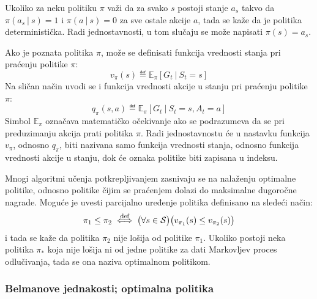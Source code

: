 Ukoliko za neku politiku $\pi$ važi da za svako $s$ postoji stanje $a_s$ takvo da $\pi(a_s~|~s)=1$ i $\pi(a~|~s)=0$ za sve ostale akcije $a$, tada se kaže da je politika deterministička. Radi jednostavnosti, u tom slučaju se može napisati $\pi(s)=a_s$.
\par 
Ako je poznata politika $\pi$, može se definisati funkcija vrednosti stanja pri praćenju politike $\pi$:
\begin{equation}
	v_{\pi}(s) \eqdef \mathbb{E}_{\pi}[G_t~|~S_t=s]
\end{equation}
Na sličan način uvodi se i funkcija vrednosti akcije u stanju pri praćenju politike $\pi$:
\begin{equation}
	q_{\pi}(s, a) \eqdef \mathbb{E}_{\pi}[G_t~|~S_t=s, A_t=a]
\end{equation}
Simbol $\mathbb{E}_{\pi}$ označava matematičko očekivanje ako se podrazumeva da se pri preduzimanju akcija prati politika $\pi$. Radi jednostavnostu će u nastavku funkcija $v_{\pi}$, odnosno $q_{\pi}$, biti nazivana samo funkcija vrednosti stanja, odnosno funkcija vrednosti akcije u stanju, dok će oznaka politike biti zapisana u indeksu.
\par 
Mnogi algoritmi učenja potkrepljivanjem zasnivaju se na nalaženju optimalne politike, odnosno politike čijim se praćenjem dolazi do maksimalne dugoročne nagrade. Moguće je uvesti parcijalno uređenje politika definisano na sledeći način:
\begin{equation}
	\label{eq:nije_losija}
	\pi_1 \leq \pi_2 \stackrel{\text{def}}{\iff} \big(\forall s \in \mathcal{S}\big) \big( v_{\pi_1}(s) \leq v_{\pi_2}(s)\big)
\end{equation}
i tada se kaže da politika $\pi_2$ nije lošija  od politike $\pi_1$. Ukoliko postoji neka politika $\pi_*$ koja nije lošija ni od jedne politike za dati Markovljev proces odlučivanja, tada se ona naziva optimalnom politikom. 

\subsubsection{Belmanove jednakosti; optimalna politika}

